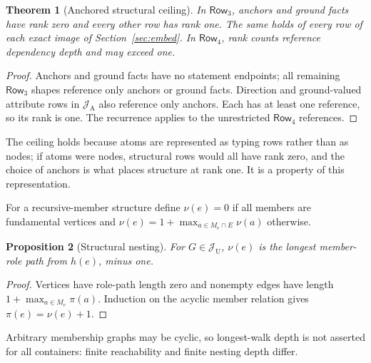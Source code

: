 \documentclass[11pt]{article}
\theoremstyle{plain}
\newtheorem{theorem}{Theorem}
\newtheorem{proposition}[theorem]{Proposition}
\theoremstyle{definition}
\theoremstyle{remark}
\newcommand{\NF}[1]{\mathsf{Row}_{#1}}
\newcommand{\Img}[1]{\mathcal J_{\mathrm{#1}}}
\begin{document}
\begin{theorem}[Anchored structural ceiling]\label{thm:flat}
In $\NF3$, anchors and ground facts have rank zero and every other row has rank one. The
same holds of every row of each exact image of Section~\ref{sec:embed}. In $\NF4$, rank
counts reference dependency depth and may exceed one.
\end{theorem}
\begin{proof}
Anchors and ground facts have no statement endpoints; all remaining $\NF3$ shapes
reference only anchors or ground facts. Direction and ground-valued attribute rows in
$\Img{A}$ also reference only anchors. Each has at least one reference, so its rank is
one. The recurrence applies to the unrestricted $\NF4$ references.
\end{proof}
The ceiling holds because atoms are represented as typing rows rather than as nodes; if
atoms were nodes, structural rows would all have rank zero, and the choice of anchors is
what places structure at rank one. It is a property of this representation.

For a recursive-member structure define $\nu(e)=0$ if all members are fundamental
vertices and $\nu(e)=1+\max_{a\in M_e\cap E}\nu(a)$ otherwise.
\begin{proposition}[Structural nesting]\label{prop:depth}
For $G\in\Img{U}$, $\nu(e)$ is the longest member-role path from $h(e)$, minus one.
\end{proposition}
\begin{proof}
Vertices have role-path length zero and nonempty edges have length $1+\max_{a\in M_e}\pi(a)$.
Induction on the acyclic member relation gives $\pi(e)=\nu(e)+1$.
\end{proof}
Arbitrary membership graphs may be cyclic, so longest-walk depth is not asserted for all
containers: finite reachability and finite nesting depth differ.
\end{document}
